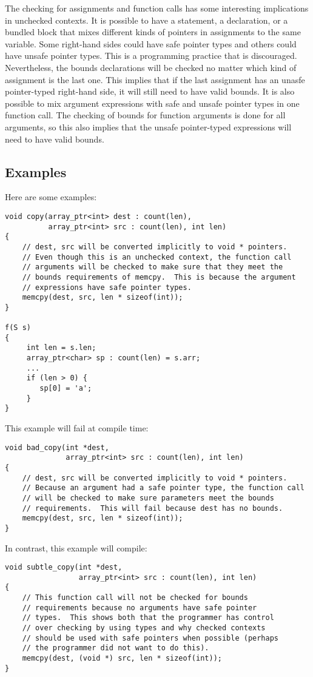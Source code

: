 The checking for assignments and function calls has some interesting 
implications in unchecked contexts.  It is possible to have a statement, 
a declaration, or a bundled block that mixes different kinds of pointers
in assignments to the same  variable.  
Some right-hand sides could have safe pointer types and others
could have unsafe pointer types.  This is a programming practice that is discouraged.
Nevertheless, the bounds declarations will be checked no matter which
kind of assignment is the last one.  This implies that if the last 
assignment has an unasfe pointer-typed right-hand side, it will still need
to have valid bounds.   It is also possible to mix argument expressions with 
safe and unsafe  pointer types in one function call.  The checking of bounds
for function arguments is done for all arguments, so this also implies that the unsafe
pointer-typed expressions will need to have valid bounds.

\subsection{Examples}

Here are some examples:
\begin{verbatim}
void copy(array_ptr<int> dest : count(len), 
          array_ptr<int> src : count(len), int len)
{
    // dest, src will be converted implicitly to void * pointers.
    // Even though this is an unchecked context, the function call
    // arguments will be checked to make sure that they meet the
    // bounds requirements of memcpy.  This is because the argument
    // expressions have safe pointer types.
    memcpy(dest, src, len * sizeof(int));
}
 
f(S s) 
{
     int len = s.len;
     array_ptr<char> sp : count(len) = s.arr;
     ...
     if (len > 0) {
        sp[0] = 'a';
     }
}
\end{verbatim}

This example will fail at compile time:
\begin{verbatim}
void bad_copy(int *dest,
              array_ptr<int> src : count(len), int len)
{
    // dest, src will be converted implicitly to void * pointers.
    // Because an argument had a safe pointer type, the function call
    // will be checked to make sure parameters meet the bounds
    // requirements.  This will fail because dest has no bounds.
    memcpy(dest, src, len * sizeof(int));
}
\end{verbatim}

In contrast, this example will compile:
\begin{verbatim}
void subtle_copy(int *dest,
                 array_ptr<int> src : count(len), int len)
{
    // This function call will not be checked for bounds
    // requirements because no arguments have safe pointer
    // types.  This shows both that the programmer has control
    // over checking by using types and why checked contexts
    // should be used with safe pointers when possible (perhaps
    // the programmer did not want to do this).
    memcpy(dest, (void *) src, len * sizeof(int));
}
\end{verbatim}

